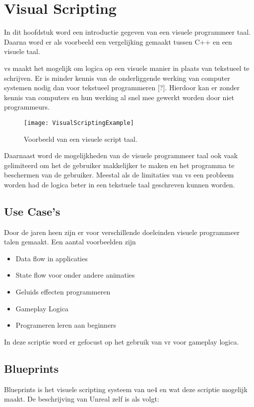\lstset {language=C++}

\chapter{Visual Scripting}
\label{ch:visualscripting}
In dit hoofdstuk word een introductie gegeven van een visuele programmeer taal. Daarna word er als voorbeeld een vergelijking gemaakt tussen C++ en een visuele taal.

\gls{vs} maakt het mogelijk om logica op een visuele manier in plaats van tekstueel te schrijven. Er is minder kennis van de onderliggende werking van computer systemen nodig dan voor tekstueel programmeren [?]. Hierdoor kan er zonder kennis van computers en hun werking al snel mee gewerkt worden door niet programmeurs. 

\begin{figure}[!ht]
  \centering
    \texttt{[image: VisualScriptingExample]}
    \caption{Voorbeeld van een visuele script taal.}
\end{figure}

Daarnaast word de mogelijkheden van de visuele programmeer taal ook vaak gelimiteerd om het de gebruiker makkelijker te maken en het programma te beschermen van de gebruiker. Meestal als de limitaties van \gls{vs} een probleem worden had de logica beter in een tekstuele taal geschreven kunnen worden.

\section{Use Case's}
Door de jaren heen zijn er voor verschillende doeleinden visuele programmeer talen gemaakt. 
Een aantal voorbeelden zijn

\begin{itemize}  
\item Data flow in applicaties 
\item State flow voor onder andere animaties 
\item Geluids effecten programmeren
\item Gameplay Logica 
\item Programeren leren aan beginners 
\end{itemize}

In deze scriptie word er gefocust op het gebruik van \gls{vr} voor gameplay logica.

\section{Blueprints}
Blueprints is het visuele scripting systeem van \gls{ue4} en wat deze scriptie mogelijk maakt. De beschrijving van Unreal zelf is als volgt:

